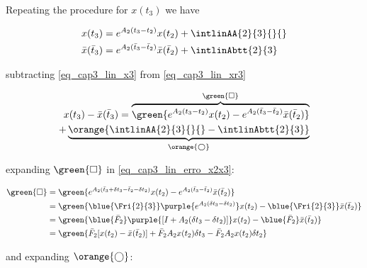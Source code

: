 
Repeating the procedure for $x(t_3)$ we have

\noindent
\begin{align}
	\label{eq_cap3_lin_x3}
	x(t_3)  &= e^{A_2(t_3-t_2)}x(t_2) + \intlinAA{2}{3}{}{} \\
	\label{eq_cap3_lin_xr3}
	\bar{x}(\bar{t}_3) &= e^{A_2(\bar{t}_3-\bar{t}_2)}\bar{x}(\bar{t}_2) + \intlinAbtt{2}{3}
\end{align}

\noindent
subtracting \eqref{eq_cap3_lin_x3} from \eqref{eq_cap3_lin_xr3} 

\noindent
\begin{equation}
	\label{eq_cap3_lin_erro_x2x3}
	\begin{split}
		x(t_3) - \bar{x}(\bar{t}_3) = \overbrace{\green{e^{A_2(t_3-t_2)}x(t_2) - e^{A_2(\bar{t}_3-\bar{t}_2)}\bar{x}(\bar{t}_2)}}^{\green{\square}} \\ 
		+ \underbrace{\orange{\intlinAA{2}{3}{}{} - \intlinAbtt{2}{3}}}_{\orange{\bigcirc}}
	\end{split}
\end{equation}

\noindent 
expanding $\green{\square}$ in \eqref{eq_cap3_lin_erro_x2x3}:

\noindent
\begin{align}
	\green{ \square } &=
	\green{
		e^{A_2(\bar{t}_3 + \delta t_3 - \bar{t}_2 - \delta t_2)} x(t_2)
		- e^{A_2(\bar{t}_3 - \bar{t}_2)} \bar{x}(\bar{t}_2)
	} \nonumber \\
	&= \green{
		\blue{\Fri{2}{3}} \purple{e^{A_2(\delta t_3 - \delta t_2)}} x(t_2)
		- \blue{\Fri{2}{3}} \bar{x}(\bar{t}_2)
	} \nonumber \\
	&= \green{
		\blue{\bar{F}_2} \purple{[I + A_2(\delta t_3 - \delta t_2)]} x(t_2)
		- \blue{\bar{F}_2} \bar{x}(\bar{t}_2)
	} \nonumber \\
	\label{eq_cap3_lin_x3_green}
	&= \green{
		\bar{F}_2 [x(t_2) - \bar{x}(\bar{t}_2)] + \bar{F}_2 A_2 x(t_2) \delta t_3
		- \bar{F}_2 A_2 x(t_2) \delta t_2
	} 
\end{align}

\noindent 
and expanding $\orange{\bigcirc}$:

